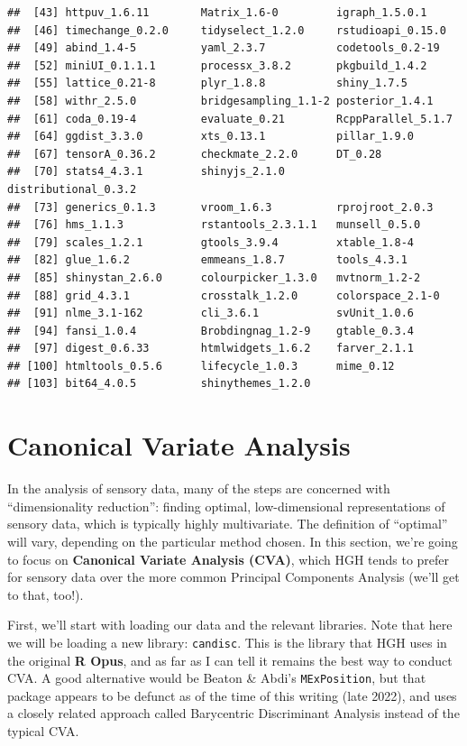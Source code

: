 \documentclass[
]{book}
\begin{document}
\begin{verbatim}
##  [43] httpuv_1.6.11        Matrix_1.6-0         igraph_1.5.0.1      
##  [46] timechange_0.2.0     tidyselect_1.2.0     rstudioapi_0.15.0   
##  [49] abind_1.4-5          yaml_2.3.7           codetools_0.2-19    
##  [52] miniUI_0.1.1.1       processx_3.8.2       pkgbuild_1.4.2      
##  [55] lattice_0.21-8       plyr_1.8.8           shiny_1.7.5         
##  [58] withr_2.5.0          bridgesampling_1.1-2 posterior_1.4.1     
##  [61] coda_0.19-4          evaluate_0.21        RcppParallel_5.1.7  
##  [64] ggdist_3.3.0         xts_0.13.1           pillar_1.9.0        
##  [67] tensorA_0.36.2       checkmate_2.2.0      DT_0.28             
##  [70] stats4_4.3.1         shinyjs_2.1.0        distributional_0.3.2
##  [73] generics_0.1.3       vroom_1.6.3          rprojroot_2.0.3     
##  [76] hms_1.1.3            rstantools_2.3.1.1   munsell_0.5.0       
##  [79] scales_1.2.1         gtools_3.9.4         xtable_1.8-4        
##  [82] glue_1.6.2           emmeans_1.8.7        tools_4.3.1         
##  [85] shinystan_2.6.0      colourpicker_1.3.0   mvtnorm_1.2-2       
##  [88] grid_4.3.1           crosstalk_1.2.0      colorspace_2.1-0    
##  [91] nlme_3.1-162         cli_3.6.1            svUnit_1.0.6        
##  [94] fansi_1.0.4          Brobdingnag_1.2-9    gtable_0.3.4        
##  [97] digest_0.6.33        htmlwidgets_1.6.2    farver_2.1.1        
## [100] htmltools_0.5.6      lifecycle_1.0.3      mime_0.12           
## [103] bit64_4.0.5          shinythemes_1.2.0
\end{verbatim}

\chapter{Canonical Variate Analysis}\label{canonical-variate-analysis}

In the analysis of sensory data, many of the steps are concerned with ``dimensionality reduction'': finding optimal, low-dimensional representations of sensory data, which is typically highly multivariate. The definition of ``optimal'' will vary, depending on the particular method chosen. In this section, we're going to focus on \textbf{Canonical Variate Analysis (CVA)}, which HGH tends to prefer for sensory data over the more common Principal Components Analysis (we'll get to that, too!).

First, we'll start with loading our data and the relevant libraries. Note that here we will be loading a new library: \texttt{candisc}. This is the library that HGH uses in the original \textbf{R Opus}, and as far as I can tell it remains the best way to conduct CVA. A good alternative would be Beaton \& Abdi's \texttt{MExPosition}, but that package appears to be defunct as of the time of this writing (late 2022), and uses a closely related approach called Barycentric Discriminant Analysis instead of the typical CVA.
\end{document}
